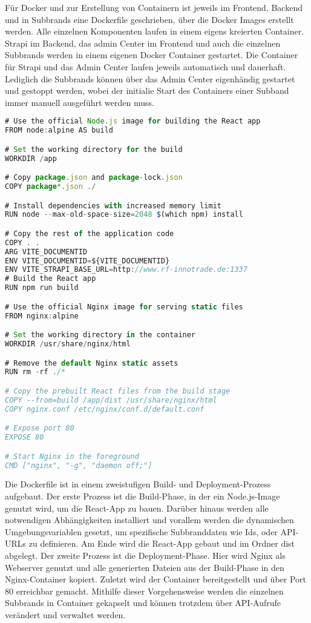 Für Docker und zur Erstellung von Containern ist jeweils im Frontend, Backend und in Subbrands eine Dockerfile geschrieben, über die Docker Images erstellt werden. Alle einzelnen Komponenten laufen in einem eigens kreierten Container. Strapi im Backend, das admin Center im Frontend und auch die einzelnen Subbrands werden in einem eigenen Docker Container gestartet.
Die Container für Strapi und das Admin Center laufen jeweils automatisch und dauerhaft. Lediglich die Subbrands können über das Admin Center eigenhändig gestartet und gestoppt werden, wobei der initialie Start des Containers einer Subband immer manuell ausgeführt werden muss.

\begin{lstlisting}[language=JavaScript, caption={Middlewares.js}, label={lst:middlewaresjs}]
# Use the official Node.js image for building the React app
FROM node:alpine AS build

# Set the working directory for the build
WORKDIR /app

# Copy package.json and package-lock.json
COPY package*.json ./

# Install dependencies with increased memory limit
RUN node --max-old-space-size=2048 $(which npm) install

# Copy the rest of the application code
COPY . .
ARG VITE_DOCUMENTID
ENV VITE_DOCUMENTID=${VITE_DOCUMENTID}
ENV VITE_STRAPI_BASE_URL=http://www.rf-innotrade.de:1337
# Build the React app
RUN npm run build

# Use the official Nginx image for serving static files
FROM nginx:alpine

# Set the working directory in the container
WORKDIR /usr/share/nginx/html

# Remove the default Nginx static assets
RUN rm -rf ./*

# Copy the prebuilt React files from the build stage
COPY --from=build /app/dist /usr/share/nginx/html
COPY nginx.conf /etc/nginx/conf.d/default.conf

# Expose port 80
EXPOSE 80

# Start Nginx in the foreground
CMD ["nginx", "-g", "daemon off;"]
\end{lstlisting}

Die Dockerfile ist in einem zweistufigen Build- und Deployment-Prozess aufgebaut.
Der erste Prozess ist die Build-Phase, in der ein Node.js-Image genutzt wird, um die React-App zu bauen. Darüber hinaus werden alle notwendigen Abhängigkeiten installiert und vorallem werden die dynamischen Umgebungsvariablen gesetzt, um spezifische Subbranddaten wie Ids, oder API-URLs zu definieren. Am Ende wird die React-App gebaut und im Ordner dist abgelegt.
Der zweite Prozess ist die Deployment-Phase. Hier wird Nginx als Webserver genutzt und alle generierten Dateien aus der Build-Phase in den Nginx-Container kopiert.
Zuletzt wird der Container bereitgestellt und über Port 80 erreichbar gemacht.
Mithilfe dieser Vorgehensweise werden die einzelnen Subbrands in Container gekapselt und können trotzdem über API-Aufrufe verändert und verwaltet werden.